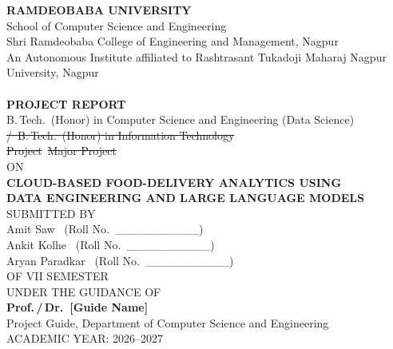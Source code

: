 \documentclass[12pt,a4paper]{report}
\begin{document}
\begin{titlepage}
\thispagestyle{empty}
\begin{center}
{\Large\bfseries RAMDEOBABA UNIVERSITY}\\[0.3cm]
{\large School of Computer Science and Engineering}\\[0.4cm]
{\small Shri Ramdeobaba College of Engineering and Management, Nagpur}\\
{\small An Autonomous Institute affiliated to Rashtrasant Tukadoji Maharaj Nagpur University, Nagpur}\\[0.6cm]

\\[0.8cm]

{\large\bfseries PROJECT REPORT}\\[0.2cm]
{\normalsize B.\,Tech.\ (Honor) in Computer Science and Engineering (Data Science)\\
\sout{/\ B.\,Tech.\ (Honor) in Information Technology}}\\[0.1cm]
{\normalsize \sout{Project}\ \sout{Major Project}}\\[0.6cm]

{\normalsize ON}\\[0.5cm]

{\Large\bfseries CLOUD-BASED FOOD-DELIVERY ANALYTICS USING\\[0.15cm]
DATA ENGINEERING AND LARGE LANGUAGE MODELS}\\[1.0cm]

{\normalsize SUBMITTED BY}\\[0.3cm]
{\normalsize Amit Saw \ (Roll No.\ \_\_\_\_\_\_\_\_\_\_)\\[0.15cm]
Ankit Kolhe \ (Roll No.\ \_\_\_\_\_\_\_\_\_\_)\\[0.15cm]
Aryan Paradkar \ (Roll No.\ \_\_\_\_\_\_\_\_\_\_)}\\[0.3cm]
{\normalsize OF VII SEMESTER}\\[0.8cm]

{\normalsize UNDER THE GUIDANCE OF}\\[0.2cm]
{\normalsize\bfseries Prof.\,/\,Dr.\ [Guide Name]}\\[0.1cm]
{\small Project Guide, Department of Computer Science and Engineering}\\[1.0cm]

{\normalsize ACADEMIC YEAR: 2026--2027}
\end{center}
\end{titlepage}
\end{document}
